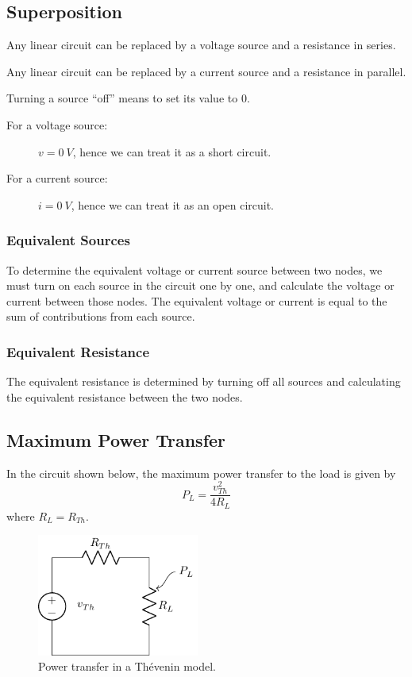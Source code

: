 \documentclass{article}
\begin{document}
\subsection{Superposition}
\begin{theorem}
    Any linear circuit can be replaced by a voltage source and a resistance in series.
\end{theorem}
\begin{theorem}
    Any linear circuit can be replaced by a current source and a resistance in parallel.
\end{theorem}
\begin{definition}
    Turning a source ``off'' means to set its value to 0.
    \begin{description}
        \item[For a voltage source:] \(v = \qty{0}{V}\), hence we can treat it as a short circuit.
        \item[For a current source:] \(i = \qty{0}{V}\), hence we can treat it as an open circuit.
    \end{description}
\end{definition}
\subsubsection{Equivalent Sources}
To determine the equivalent voltage or current source between two nodes, we must
turn on each source in the circuit one by one, and calculate the voltage or current
between those nodes.
The equivalent voltage or current is equal to the sum of contributions from each source.
\subsubsection{Equivalent Resistance}
The equivalent resistance is determined by turning off all sources and calculating the
equivalent resistance between the two nodes.
\subsection{Maximum Power Transfer}
In the circuit shown below, the maximum power transfer to the load is given by
\begin{equation*}
    P_L = \frac{v_{Th}^2}{4R_L}
\end{equation*}
where \(R_L = R_{Th}\).
\begin{figure}[H]
    \centering
    \includegraphics[height = 4cm, keepaspectratio = true]{figures/max_power_transfer.pdf}
    \caption{Power transfer in a Thévenin model.}
\end{figure}
\newpage
\end{document}
